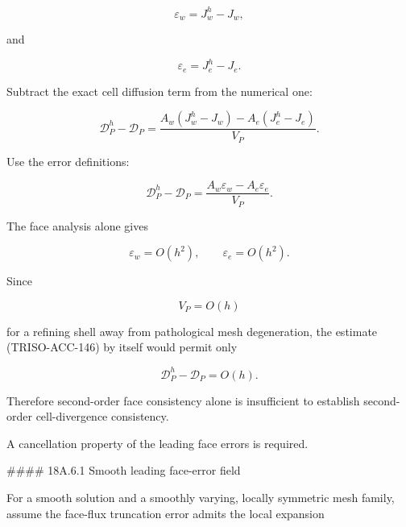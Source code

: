 \documentclass[11pt,a4paper]{article}
\begin{document}
\begin{equation}
\varepsilon_w
=
J_w^h-J_w,
\tag{TRISO-ACC-142}
\label{eq:triso-acc-142}
\end{equation}

and

\begin{equation}
\varepsilon_e
=
J_e^h-J_e.
\tag{TRISO-ACC-143}
\label{eq:triso-acc-143}
\end{equation}

Subtract the exact cell diffusion term from the numerical one:

\begin{equation}
\mathcal D_P^h-\mathcal D_P
=
\frac{
A_w(J_w^h-J_w)
-
A_e(J_e^h-J_e)
}{
V_P
}.
\tag{TRISO-ACC-144}
\label{eq:triso-acc-144}
\end{equation}

Use the error definitions:

\begin{equation}
\boxed{
\mathcal D_P^h-\mathcal D_P
=
\frac{
A_w\varepsilon_w-A_e\varepsilon_e
}{
V_P}.
}
\tag{TRISO-ACC-145}
\label{eq:triso-acc-145}
\end{equation}

The face analysis alone gives

\begin{equation}
\varepsilon_w=O(h^2),
\qquad
\varepsilon_e=O(h^2).
\tag{TRISO-ACC-146}
\label{eq:triso-acc-146}
\end{equation}

Since

\begin{equation}
V_P=O(h)
\tag{TRISO-ACC-147}
\label{eq:triso-acc-147}
\end{equation}

for a refining shell away from pathological mesh degeneration, the estimate (TRISO-ACC-146) by itself would permit only

\begin{equation}
\mathcal D_P^h-\mathcal D_P=O(h).
\tag{TRISO-ACC-148}
\label{eq:triso-acc-148}
\end{equation}

Therefore second-order face consistency alone is insufficient to establish second-order cell-divergence consistency.

A cancellation property of the leading face errors is required.

\#\#\#\# 18A.6.1 Smooth leading face-error field

For a smooth solution and a smoothly varying, locally symmetric mesh family, assume the face-flux truncation error admits the local expansion
\end{document}
